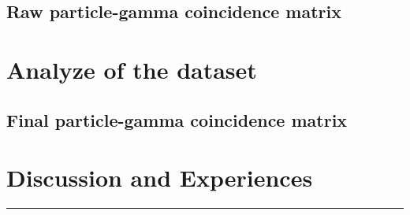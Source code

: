 \documentclass[11pt,a4wide]{article}
\begin{document}
\subsection{Raw particle-gamma coincidence matrix}

\section{Analyze of the dataset}
\subsection{Final particle-gamma coincidence matrix}


\section{Discussion and Experiences}


\noindent\rule{\textwidth}{1pt}
\end{document}
